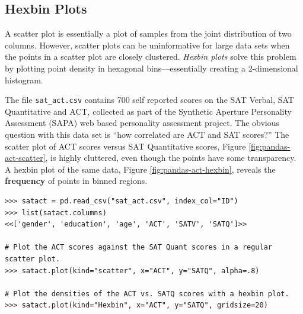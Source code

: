 \subsection*{Hexbin Plots} %

A scatter plot is essentially a plot of samples from the joint distribution of two columns.
However, scatter plots can be uninformative for large data sets when the points in a scatter plot are closely clustered.
\emph{Hexbin plots} solve this problem by plotting point density in hexagonal bins---essentially creating a 2-dimensional histogram.

The file \texttt{sat\_act.csv} contains 700 self reported scores on the SAT Verbal, SAT Quantitative and ACT, collected as part of the Synthetic Aperture Personality Assessment (SAPA) web based personality assessment project.
The obvious question with this data set is ``how correlated are ACT and SAT scores?''
The scatter plot of ACT scores versus SAT Quantitative scores, Figure \ref{fig:pandas-act-scatter}, is highly cluttered, even though the points have some transparency.
A hexbin plot of the same data, Figure \ref{fig:pandas-act-hexbin}, reveals the \textbf{frequency} of points in binned regions.

\newpage

\begin{lstlisting}
>>> satact = pd.read_csv("sat_act.csv", index_col="ID")
>>> list(satact.columns)
<<['gender', 'education', 'age', 'ACT', 'SATV', 'SATQ']>>

# Plot the ACT scores against the SAT Quant scores in a regular scatter plot.
>>> satact.plot(kind="scatter", x="ACT", y="SATQ", alpha=.8)

# Plot the densities of the ACT vs. SATQ scores with a hexbin plot.
>>> satact.plot(kind="Hexbin", x="ACT", y="SATQ", gridsize=20)
\end{lstlisting}

